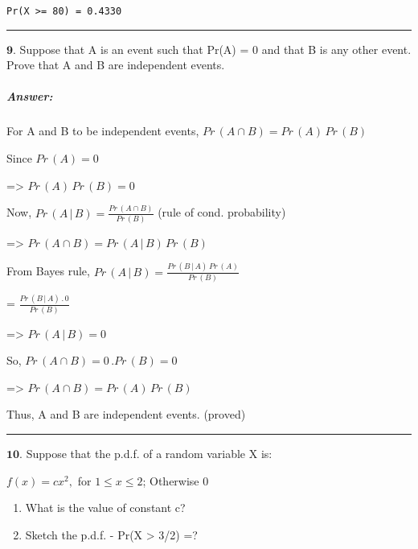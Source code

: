 \documentclass[11pt]{article}
\begin{document}
    \begin{Verbatim}[commandchars=\\\{\}]
Pr(X >= 80) = 0.4330
    \end{Verbatim}

    \begin{center}\rule{0.5\linewidth}{\linethickness}\end{center}

\(\textbf{9.}\) Suppose that A is an event such that Pr(A) = 0 and that
B is any other event. Prove that A and B are independent events.

    \hypertarget{answer}{%
\subparagraph{Answer:}\label{answer}}

For A and B to be independent events,
\(Pr \, (A \cap B) = Pr \, (A) \, Pr \, (B)\)

Since \(Pr \, (A) = 0\)

=\textgreater{} \(Pr \, (A) \, Pr \, (B) = 0\)

Now, \(Pr \, (A \, | \, B) = \frac{Pr \, (A \cap B)}{Pr \, (B)}\) (rule
of cond. probability)

=\textgreater{} \(Pr \, (A \cap B) = Pr \, (A \, | \, B) \, Pr \, (B)\)

From Bayes rule,
\(Pr \, (A \, | \, B) = \frac{Pr \, (B \, | \, A) \, Pr \, (A)}{Pr \, (B)}\)

= \(\frac{Pr \, (B \, | \, A) \,. \, 0}{Pr \, (B)}\)

=\textgreater{} \(Pr \, (A \, | \, B) = 0\)

So, \(Pr \, (A \cap B) = 0 \, . Pr \, (B) = 0\)

=\textgreater{} \(Pr \, (A \cap B) = Pr \, (A) \, Pr \, (B)\)

Thus, A and B are independent events. (proved)

\newpage
    \begin{center}\rule{0.5\linewidth}{\linethickness}\end{center}


\(\textbf{10.}\) Suppose that the p.d.f. of a random variable X is:

\(f(x) = c x^2,\) for \(1 \leq x \leq 2\); Otherwise \(0\)

\begin{enumerate}
\def\labelenumi{\alph{enumi})}
\item
  What is the value of constant c?
\item
  Sketch the p.d.f. - Pr(X \textgreater{} 3/2) =?
\end{enumerate}
\end{document}
